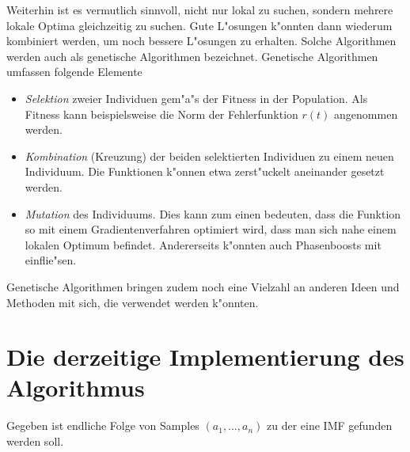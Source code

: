 \documentclass[a4paper]{scrartcl}
\begin{document}
Weiterhin ist es vermutlich sinnvoll, nicht nur lokal zu suchen, sondern mehrere lokale Optima gleichzeitig zu suchen. Gute L"osungen k"onnten dann wiederum kombiniert werden, um noch bessere L"osungen zu erhalten. Solche Algorithmen werden auch als genetische Algorithmen bezeichnet. Genetische Algorithmen umfassen folgende Elemente
\begin{itemize}
  \item {\em Selektion} zweier Individuen gem"a"s der Fitness in der Population. Als Fitness kann beispielsweise die Norm der Fehlerfunktion $r(t)$ angenommen werden.  
  \item {\em Kombination} (Kreuzung) der beiden selektierten Individuen zu einem neuen Individuum. Die Funktionen k"onnen etwa zerst"uckelt aneinander gesetzt werden.
  \item {\em Mutation} des Individuums. Dies kann zum einen bedeuten, dass die Funktion so mit einem Gradientenverfahren optimiert wird, dass man sich nahe einem lokalen Optimum befindet. Andererseits k"onnten auch Phasenboosts mit einflie"sen. 
\end{itemize}
Genetische Algorithmen bringen zudem noch eine Vielzahl an anderen Ideen und Methoden mit sich, die verwendet werden k"onnten. 


\section{Die derzeitige Implementierung des Algorithmus}

Gegeben ist endliche Folge von Samples $(a_1,\ldots,a_n)$ zu der eine IMF gefunden werden soll. 

\end{document}
